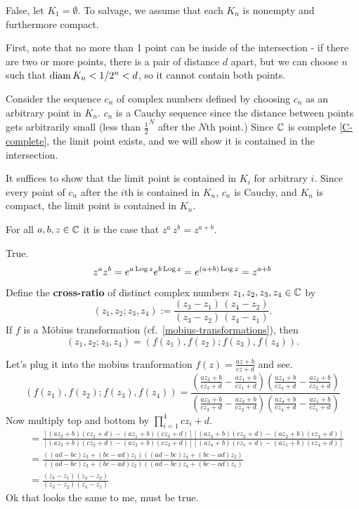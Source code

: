 \documentclass{homework}
\begin{document}
\begin{solution}
False, let $K_1 = \emptyset$. To salvage, we assume that each $K_n$ is nonempty and furthermore compact.

First, note that no more than 1 point can be inside of the intersection - if there are two or more points, there is a pair of distance $d$ apart, but we can choose $n$ such that $\operatorname{diam} K_n < 1/2^n < d$, so it cannot contain both points.

Consider the sequence $c_n$ of complex numbers defined by choosing $c_n$ as an arbitrary point in $K_n$. $c_n$ is a Cauchy sequence since the distance between points gets arbitrarily small (less than $\frac{1}{2}^N$ after the $N$th point.) Since $\mathbb{C}$ is complete \ref{C-complete}, the limit point exists, and we will show it is contained in the intersection.

It suffices to show that the limit point is contained in $K_i$ for arbitrary $i$. Since every point of $c_n$ after the $i$th is contained in $K_n$, $c_n$ is Cauchy, and $K_n$ is compact, the limit point is contained in $K_n$.
\end{solution}

\begin{problem}
 For all $a, b, z \in \mathbb{C}$ it is the case that $z^a \, z^b = z^{a+b}$.
\end{problem}
\begin{solution}
True.
\[
z^az^b = e^{a\operatorname{Log}{z}}e^{b\operatorname{Log}{z}} = e^{(a+b)\operatorname{Log}{z}} = z^{a+b}
\]
\end{solution}


\begin{problem}\label{cross-ratio}
  Define the \textbf{cross-ratio} of distinct complex numbers $z_1,z_2,z_3,z_4 \in \mathbb{C}$ by
\[
\left(z_1,z_2;z_3,z_4\right):=\frac {\left(z_3-z_1\right)\,\left(z_4-z_2\right)}{\left(z_3-z_2\right)\,\left(z_4-z_1\right)}.
 \]
 If $f$ is a M\"obius transformation (cf.~\ref{mobius-transformations}), then
 \[
   \left(z_1,z_2;z_3,z_4\right) =
   \left(f(z_1),f(z_2);f(z_3),f(z_4)\right).
\]
\end{problem}
\begin{solution}
Let's plug it into the mobius tranformation $f(z) = \frac{az + b}{cz + d}$ and see.
\[
\left(f(z_1),f(z_2);f(z_3),f(z_4)\right) = 
\frac{
(\frac{az_3+b}{cz_3+d} - \frac{az_1+b}{cz_1+d})(\frac{az_4+b}{cz_4+d} - \frac{az_2+b}{cz_2+d})
}{
(\frac{az_3+b}{cz_3+d}-\frac{az_2+b}{cz_2+d})(\frac{az_4+b}{cz_4+d}-\frac{az_1+b}{cz_1+d})
}
\]
Now multiply top and bottom by $\prod_{i=1}^4 cz_i + d.$
\begin{align*}
&=\frac{
[(az_3 + b)(cz_1+d) - (az_1 + b)(cz_3 + d)][(az_4 + b)(cz_2+d) - (az_2 + b)(cz_4 + d)]
}{
[(az_3 + b)(cz_2+d) - (az_2 + b)(cz_3 + d)][(az_4 + b)(cz_1+d) - (az_1 + b)(cz_4 + d)]
}\\
&=\frac{
((ad-bc)z_3 + (bc-ad)z_1)((ad-bc)z_4 + (bc-ad)z_2)
}{
((ad-bc)z_3 + (bc-ad)z_2)((ad-bc)z_4 + (bc-ad)z_1)
}\\
&= \frac{(z_3 - z_1)(z_4-z_2)}{(z_3-z_2)(z_4 - z_1)}
\end{align*}
Ok that looks the same to me, must be true.
\end{solution}
\end{document}
